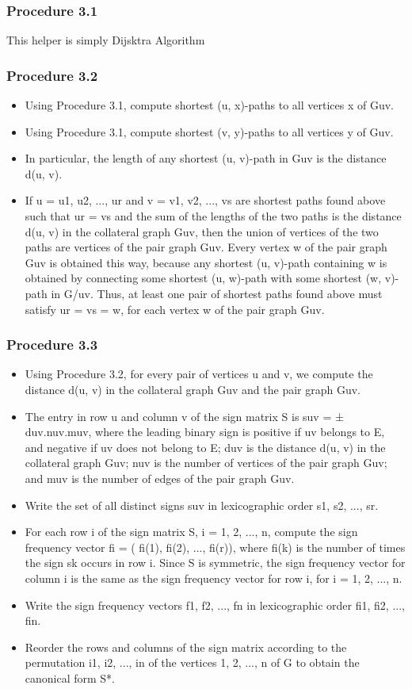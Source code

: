 \documentclass[11pt]{article}
\begin{document}
\subsubsection{Procedure 3.1}
This helper is simply Dijsktra Algorithm
\subsubsection{Procedure 3.2}
\begin{itemize}
    \item Using Procedure 3.1, compute shortest (u, x)-paths to all vertices x of Guv.
    \item Using Procedure 3.1, compute shortest (v, y)-paths to all vertices y of Guv.
    \item In particular, the length of any shortest (u, v)-path in Guv is the distance d(u, v).
    \item If u = u1, u2, ..., ur and v = v1, v2, ..., vs are shortest paths found above such that ur = vs and the sum of the lengths of the two paths is the distance d(u, v) in the collateral graph Guv, then the union of  vertices of the two paths are vertices of the pair graph Guv. Every vertex w of the pair graph Guv is obtained this way, because any shortest (u, v)-path containing w is obtained by connecting some shortest (u, w)-path with some shortest (w, v)-path in G/uv. Thus, at least one pair of shortest paths found above must satisfy ur = vs = w, for each vertex w of the pair graph Guv.
\end{itemize}
\subsubsection{Procedure 3.3}
\begin{itemize}
    \item Using Procedure 3.2, for every pair of vertices u and v, we compute the distance d(u, v) in the collateral graph Guv and the pair graph Guv.
    \item The entry in row u and column v of the sign matrix S is suv = ± duv.nuv.muv, where the leading binary sign is positive if uv belongs to E, and negative if uv does not belong to E; duv is the distance d(u, v) in the collateral graph Guv; nuv is the number of vertices of the pair graph Guv; and muv is the number of edges of the pair graph Guv.
    \item Write the set of all distinct signs suv in lexicographic order s1, s2, ..., sr.
    \item For each row i of the sign matrix S, i = 1, 2, ..., n, compute the sign frequency vector fi = ( fi(1), fi(2), ...,  fi(r)), where  fi(k) is the number of times the sign sk occurs in row i. Since S is symmetric, the sign frequency vector for column i is the same as the sign frequency vector for row i, for i = 1, 2, ..., n.
    \item Write the sign frequency vectors f1, f2, ..., fn in lexicographic order  fi1, fi2, ..., fin.
    \item Reorder the rows and columns of the sign matrix according to the permutation i1, i2, ..., in of the vertices 1, 2, ..., n of G to obtain the canonical form S*.
\end{itemize}
\end{document}
